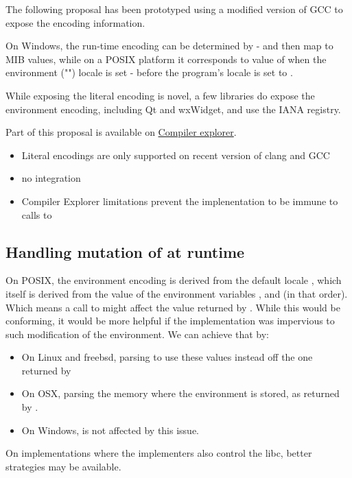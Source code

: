 \documentclass{wg21}
\begin{document}
The following proposal has been prototyped using a modified version of GCC to expose the encoding information.

On Windows, the run-time encoding can be determined by  - and then map to MIB values, while on a POSIX platform it corresponds to value of  when the environment ("") locale is set - before the program's locale is set to .


While exposing the literal encoding is novel, a few libraries do expose the environment encoding, including Qt and wxWidget, and use the IANA registry.

Part of this proposal is available on \href{https://compiler-explorer.com/z/KMPeGnEje}{Compiler explorer}.
\begin{itemize}
\item Literal encodings are only supported on recent version of clang and GCC
\item no  integration
\item Compiler Explorer limitations prevent the implenentation to be immune to calls to 
\end{itemize}

\subsection{Handling mutation of  at runtime}

On POSIX, the environment encoding is derived from the default locale , which
itself is derived from the value of the environment variables ,  and 
(in that order).
Which means a call to  might affect the value returned by .
While this would be conforming, it would be more helpful if the implementation was impervious to such modification of the environment.
We can achieve that by:
\begin{itemize}
\item On Linux and freebsd, parsing  to use these values instead off the one returned by 
\item On OSX, parsing the memory where the environment is stored, as returned by .
\item On Windows,  is not affected by this issue.
\end{itemize}

On implementations where the implementers also control the libc, better strategies may be available.
\end{document}
